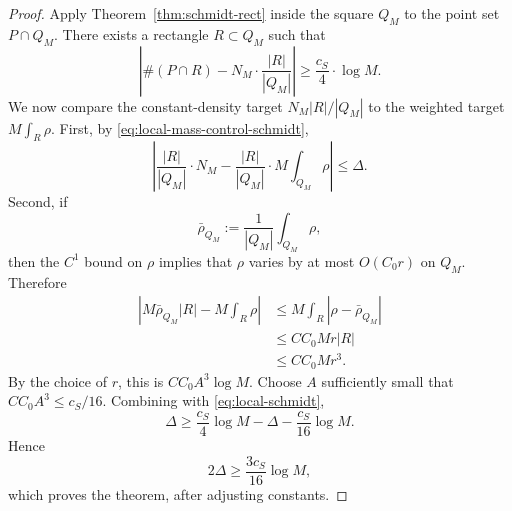 \documentclass[10pt,a4paper]{amsart}
\begin{document}
\begin{proof}
\bigskip
\noindent
Apply Theorem~\ref{thm:schmidt-rect} inside the square $Q_M$ to the point set $P\cap Q_M$.  There exists a rectangle $R\subset Q_M$ such that
\begin{equation}\label{eq:local-schmidt}
        \left|
        \#(P\cap R)-N_M\cdot\frac{|R|}{|Q_M|}
        \right|
        \ge \frac{c_S}{4}\cdot\log M.
\end{equation}
We now compare the constant-density target $N_M|R|/|Q_M|$ to the weighted target $M\int_R\rho$.  First, by \eqref{eq:local-mass-control-schmidt},
\[
        \left|
        \frac{|R|}{|Q_M|}\cdot N_M
        -
        \frac{|R|}{|Q_M|}\cdot M\int_{Q_M}\rho
        \right|
        \le \Delta.
\]
Second, if
\[
        \bar\rho_{Q_M}:=\frac1{|Q_M|}\int_{Q_M}\rho,
\]
then the $C^1$ bound on $\rho$ implies that $\rho$ varies by at most $O(C_0r)$ on $Q_M$. Therefore
\[
\begin{aligned}
        \left|
        M\bar\rho_{Q_M}|R|-M\int_R\rho
        \right|
        &\le M\int_R |\rho-\bar\rho_{Q_M}| \\
        &\le C C_0 M r |R| \\
        &\le C C_0 M r^3.
\end{aligned}
\]
By the choice of $r$, this is $C C_0A^3\log M$.  Choose $A$ sufficiently small that $C C_0A^3\le c_S/16$.  Combining with \eqref{eq:local-schmidt},
\[
        \Delta\ge \frac{c_S}{4}\log M-\Delta-\frac{c_S}{16}\log M.
\]
Hence
\[
        2\Delta\ge \frac{3c_S}{16}\log M,
\]
which proves the theorem, after adjusting constants.
\end{proof}
\end{document}
